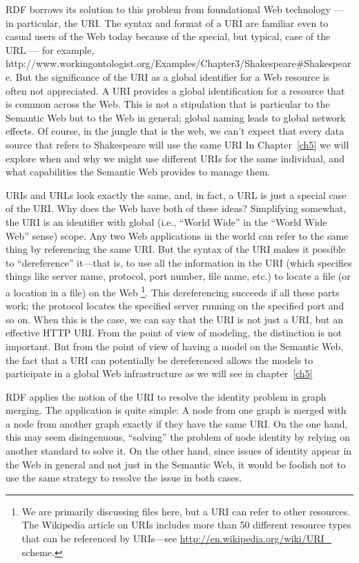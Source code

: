 RDF borrows its solution to this problem from foundational Web
technology --- in particular, the URI. The syntax and format of a URI are
familiar even to casual users of the Web today because of the special,
but typical, case of the URL --- for example,
{http://www.workingontologist.org/Examples/Chapter3/Shakespeare\#Shakespeare}. 
But the significance of the URI as a
global identifier for a Web resource is often not appreciated. A URI
provides a global identification for a resource that is common across
the Web. This is not a stipulation that is particular to the Semantic
Web but to the Web in general; global naming leads to global network
effects. Of course, in the jungle that is the web, we can't expect that
every data source that refers to Shakespeare will use the same URI In
Chapter~\ref{ch5} we will explore when and why we might use different URIs for
the same individual, and what capabilities the Semantic Web provides to
manage them.

URIs and URLs look exactly the same, and, in fact, a URL is just a
special case of the URI. Why does the Web have both of these ideas?
Simplifying somewhat, the URI is an identifier with global (i.e.,
``World Wide'' in the ``World Wide Web'' sense) scope. Any two Web
applications in the world can refer to the same thing by referencing the
same URI. But the syntax of the URI makes it possible to ``dereference''
it---that is, to use all the information in the URI (which specifies
things like server name, protocol, port number, file name, etc.) to
locate a file (or a location in a file) on the Web \footnote{We are primarily discussing files here, but a URI can refer to other
resources. The Wikipedia article on URIs includes more than 50 different
resource types that can be referenced by URIs---see
\url{http://en.wikipedia.org/wiki/URI_} scheme.}. This
dereferencing succeeds if all these parts work; the protocol locates the
specified server running on the specified port and so on. When this is
the case, we can say that the URI is not just a URI, but an effective
HTTP URI. From the point of view of modeling, the distinction is not
important. But from the point of view of having a model on the Semantic
Web, the fact that a URI can potentially be dereferenced allows the
models to participate in a global Web infrastructure as we will see in
chapter~\ref{ch5}

RDF applies the notion of the URI to resolve the identity problem in
graph merging. The application is quite simple: A node from one graph is
merged with a node from another graph exactly if they have the same
URI. On the one hand, this may seem disingenuous, ``solving'' the
problem of node identity by relying on another standard to solve it. On
the other hand, since issues of identity appear in the Web in general
and not just in the Semantic Web, it would be foolish not to use the
same strategy to resolve the issue in both cases.

